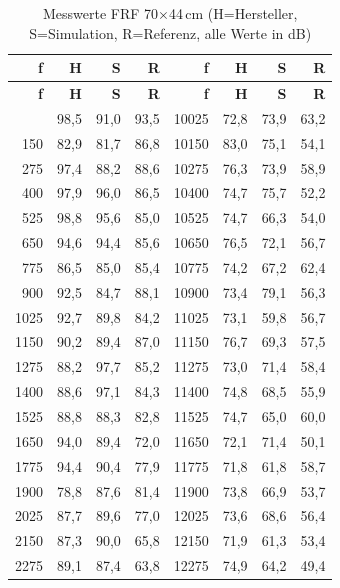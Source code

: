 \begin{small}
\setlength{\tabcolsep}{2pt}
\renewcommand{\arraystretch}{1.0}
\begin{longtable}{|r|r|r|r|r|r|r|r|}
\caption{Messwerte FRF 70$\times$44\,cm (H=Hersteller, S=Simulation, R=Referenz, alle Werte in dB)} \\
\hline
\textbf{f} & \textbf{H} & \textbf{S} & \textbf{R} & \textbf{f} & \textbf{H} & \textbf{S} & \textbf{R} \\
\hline
\endfirsthead
\hline
\textbf{f} & \textbf{H} & \textbf{S} & \textbf{R} & \textbf{f} & \textbf{H} & \textbf{S} & \textbf{R} \\
\hline
\endhead
\hline
\endfoot
\hline
\endlastfoot
25 & 98,5 & 91,0 & 93,5 & 10025 & 72,8 & 73,9 & 63,2 \\ \hline
150 & 82,9 & 81,7 & 86,8 & 10150 & 83,0 & 75,1 & 54,1 \\ \hline
275 & 97,4 & 88,2 & 88,6 & 10275 & 76,3 & 73,9 & 58,9 \\ \hline
400 & 97,9 & 96,0 & 86,5 & 10400 & 74,7 & 75,7 & 52,2 \\ \hline
525 & 98,8 & 95,6 & 85,0 & 10525 & 74,7 & 66,3 & 54,0 \\ \hline
650 & 94,6 & 94,4 & 85,6 & 10650 & 76,5 & 72,1 & 56,7 \\ \hline
775 & 86,5 & 85,0 & 85,4 & 10775 & 74,2 & 67,2 & 62,4 \\ \hline
900 & 92,5 & 84,7 & 88,1 & 10900 & 73,4 & 79,1 & 56,3 \\ \hline
1025 & 92,7 & 89,8 & 84,2 & 11025 & 73,1 & 59,8 & 56,7 \\ \hline
1150 & 90,2 & 89,4 & 87,0 & 11150 & 76,7 & 69,3 & 57,5 \\ \hline
1275 & 88,2 & 97,7 & 85,2 & 11275 & 73,0 & 71,4 & 58,4 \\ \hline
1400 & 88,6 & 97,1 & 84,3 & 11400 & 74,8 & 68,5 & 55,9 \\ \hline
1525 & 88,8 & 88,3 & 82,8 & 11525 & 74,7 & 65,0 & 60,0 \\ \hline
1650 & 94,0 & 89,4 & 72,0 & 11650 & 72,1 & 71,4 & 50,1 \\ \hline
1775 & 94,4 & 90,4 & 77,9 & 11775 & 71,8 & 61,8 & 58,7 \\ \hline
1900 & 78,8 & 87,6 & 81,4 & 11900 & 73,8 & 66,9 & 53,7 \\ \hline
2025 & 87,7 & 89,6 & 77,0 & 12025 & 73,6 & 68,6 & 56,4 \\ \hline
2150 & 87,3 & 90,0 & 65,8 & 12150 & 71,9 & 61,3 & 53,4 \\ \hline
2275 & 89,1 & 87,4 & 63,8 & 12275 & 74,9 & 64,2 & 49,4 \\ \hline

\end{longtable}
\end{small}
